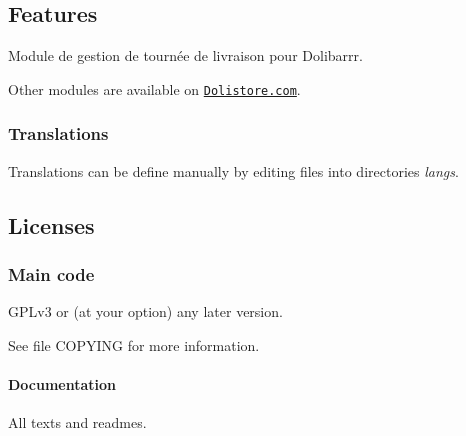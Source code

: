 \subsection*{Features}

Module de gestion de tournée de livraison pour Dolibarrr.

Other modules are available on \href{https://www.dolistore.com}{\tt Dolistore.\+com}.

\subsubsection*{Translations}

Translations can be define manually by editing files into directories {\itshape langs}.

\subsection*{Licenses }

\subsubsection*{Main code}



G\+P\+Lv3 or (at your option) any later version.

See file C\+O\+P\+Y\+I\+NG for more information.

\paragraph*{Documentation}

All texts and readmes.

 